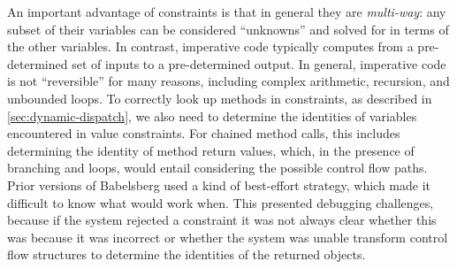 \documentclass[10pt,reprint]{sigplanconf-preprint}
\def\ab#1{\todo[size=\footnotesize,color=red!40]{\textsf{AB: #1}}}
\def\tf#1{\todo[size=\footnotesize,color=purple!40]{\textsf{TF: #1}}}
\begin{document}
An important advantage of constraints is that in general they are
\emph{multi-way}: any subset of their variables can be considered
``unknowns'' and solved for in terms of the other variables.  In
contrast, imperative code typically computes from a pre-determined set
of inputs to a pre-determined output.  In general, imperative code is
not ``reversible'' for many reasons, including complex arithmetic,
recursion, and unbounded loops.
%
To correctly look up methods in constraints, as described in
\autoref{sec:dynamic-dispatch}, we also need to determine the
identities of variables encountered in value constraints. For chained
method calls, this includes determining the identity of method
return values, which, in the presence of branching and loops, would
entail considering the possible control flow paths. Prior
versions of Babelsberg used a kind of best-effort strategy, which
made it difficult to know what would work when.  This
presented debugging challenges, because if the system rejected a
constraint it was not always clear whether this was because it was
incorrect or whether the system was unable transform control flow structures
to determine the identities of the returned objects.
\end{document}
